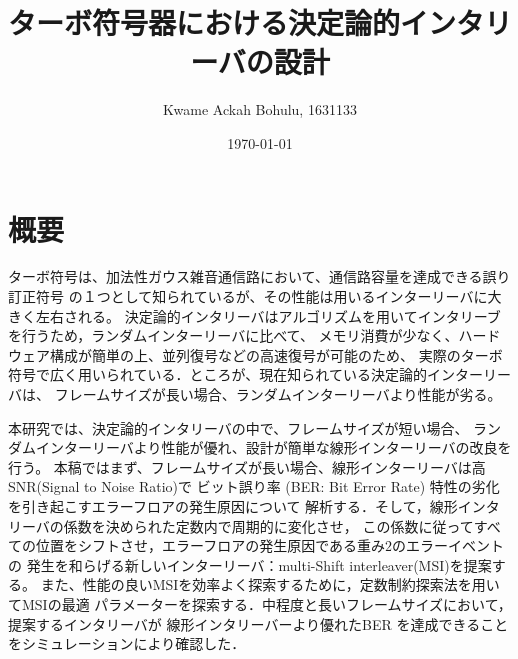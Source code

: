 \documentclass[20 pts]{article}
\title{ターボ符号器における決定論的インタリーバの設計}
\author{Kwame Ackah Bohulu, 1631133}
\date{\today}
\begin{document}
\maketitle


\section{概要}
 
 
 
ターボ符号は、加法性ガウス雑音通信路において、通信路容量を達成できる誤り訂正符号
の１つとして知られているが、その性能は用いるインターリーバに大きく左右される。
決定論的インタリーバはアルゴリズムを用いてインタリーブを行うため，ランダムインターリーバに比べて、
メモリ消費が少なく、ハードウェア構成が簡単の上、並列復号などの高速復号が可能のため、
実際のターボ符号で広く用いられている．ところが、現在知られている決定論的インターリーバは、
フレームサイズが長い場合、ランダムインターリーバより性能が劣る。

本研究では、決定論的インタリーバの中で、フレームサイズが短い場合、
ランダムインターリーバより性能が優れ、設計が簡単な線形インターリーバの改良を行う。
本稿ではまず、フレームサイズが長い場合、線形インターリーバは高SNR(Signal to Noise Ratio)で
ビット誤り率 (BER: Bit Error Rate) 特性の劣化を引き起こすエラーフロアの発生原因について
解析する．そして，線形インタリーバの係数を決められた定数内で周期的に変化させ，
この係数に従ってすべての位置をシフトさせ，エラーフロアの発生原因である重み$2$のエラーイベントの
発生を和らげる新しいインターリーバ：multi-Shift interleaver(MSI)を提案する。
また、性能の良いMSIを効率よく探索するために，定数制約探索法を用いてMSIの最適
パラメーターを探索する．中程度と長いフレームサイズにおいて，提案するインタリーバが
線形インタリーバーより優れたBER を達成できることをシミュレーションにより確認した．
\end{document}

